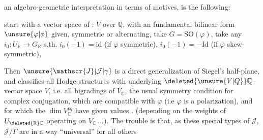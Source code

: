an algebro-geometric interpretation in terms of  motives, is the following:

start with a vector space of  : $V$ over $\mathbb{Q}$, with an fundamental bilinear form $\unsure{\varphi|\phi}$ given, symmetric or alternating, take $G=\mathrm{SO}(\varphi)$, take any $i_0:U_{\mathbb{R}}\to G_{\mathbb{R}}$ s.th. $i_0(-1)=\mathrm{id}$ (if $\varphi$ symmetric), $i_0(-1)=-\mathrm{Id}$ (if $\varphi$  skew-symmetric),   

Then $\unsure{\mathscr{J}|\mathcal{J}|\gamma}$ is a direct generalization of Siegel's half-plane, and classifies all Hodge-structures  with underlying $\deleted{\unsure{V|Q}}\mathbb{Q}$-vector space $V$,  i.e. all bigradings of $V_{\mathbb{C}}$,   the usual symmetry condition for complex conjugation, which are compatible with $\varphi$ (i.e $\varphi$ is a polarization), and for which the $\dim V_{\mathbb{C}}^{pq}$ have given values . (depending on the weights of $U_{\deleted{\mathbb{R}}\mathbb{C}}$ operating on $V_{\mathbb{C}}\ \ldots$). The trouble is that,  as these special types of $\mathscr{J}$, $\mathscr{J}/\Gamma$ are in a way ``universal'' for all others
